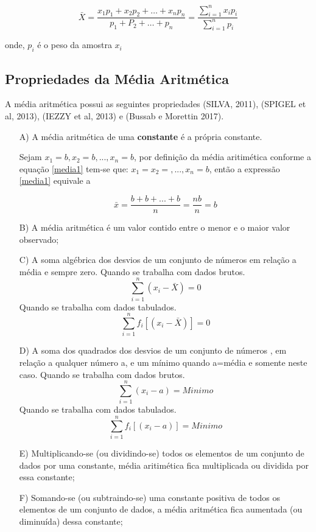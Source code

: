 \begin{equation}\label{media}
    \bar{X}=\frac{x_{1}p_{1}+x_{2}p_{2}+\ldots+x_{n}p_{n}}{p_{1}+P_{2}+\ldots+p_{n}}=\frac{\sum_{i=1}^{n}x_{i}p_{i}}{\sum_{i=1}^{n}p_{i}}
\end{equation}

onde, $p_{i}$ é o peso da amostra $x_{i}$


\subsection{Propriedades da Média Aritmética}

A média aritmética possui as seguintes propriedades (SILVA, 2011), (SPIGEL et al, 2013), (IEZZY et al, 2013) e (Bussab e Morettin 2017). 

\begin{enumerate}
\item [{A)}] A média aritmética de uma \textbf{constante} é a própria constante.

Sejam  $x_{1}=b, x_{2}=b, ..., x_{n}=b$, por definição da média aritimética conforme a equação \ref{media1} tem-se que: $x_{1}=x_{2}=,..., x_{n}=b$, então a expressão \ref{media1} equivale a

\begin{equation}\label{propriedade1}
\bar{x}=\frac{b+b+...+b}{n}=\frac{nb}{n}=b
\end{equation}
 

\item [{B)}] A média aritmética é um valor contido entre o menor e o maior valor observado; 
\item [{C)}] A soma algébrica dos desvios de um conjunto de números em relação a média e sempre zero.\vskip0.3cm
Quando se trabalha com dados brutos.
$$ \sum_{i=1}^{n}(x_{i}-\bar{X})=0 $$
Quando se trabalha com dados tabulados.
$$ \sum_{i=1}^{n}f_{i}[(x_{i}-\bar{X})]=0 $$
\item [{D)}] A soma dos quadrados dos desvios de um conjunto de números , em relação a qualquer número a, e um mínimo quando a=média e somente neste caso.\vskip0.3cm
Quando se trabalha com dados brutos.
$$ \sum_{i=1}^{n}(x_{i}- a)= Minimo  $$
Quando se trabalha com dados tabulados.
$$ \sum_{i=1}^{n}f_{i}[(x_{i}- a)]= Minimo  $$
  \item [{E)}] Multiplicando-se (ou dividindo-se) todos os elementos
de um conjunto de dados por uma constante, média aritimética fica multiplicada ou dividida por essa constante;
\item [{F)}] Somando-se (ou subtraindo-se) uma constante positiva de todos os elementos de um conjunto de dados, a média aritmética fica aumentada (ou diminuída) dessa constante;



\end{enumerate}
